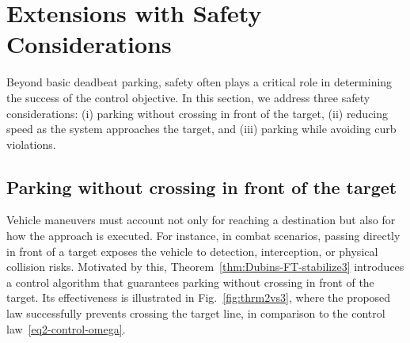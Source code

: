 \documentclass[letterpaper, 10 pt, conference]{ieeeconf}  %
\begin{document}
\section{Extensions with Safety Considerations}

Beyond basic deadbeat parking, safety often plays a critical role in determining the success of the control objective. In this section, we address three safety considerations: (i) parking without crossing in front of the target, (ii) reducing speed as the system approaches the target, and (iii) parking while avoiding curb violations.

\subsection{Parking without crossing in front of the target}

Vehicle maneuvers must account not only for reaching a destination but also for how the approach is executed. For instance, in combat scenarios, passing directly in front of a target exposes the vehicle to detection, interception, or physical collision risks. Motivated by this, Theorem~\ref{thm:Dubins-FT-stabilize3} introduces a control algorithm that guarantees parking without crossing in front of the target. Its effectiveness is illustrated in Fig.~\ref{fig:thrm2vs3}, where the proposed law successfully prevents crossing the target line, in comparison to the control law~\eqref{eq2-control-omega}.
\end{document}
